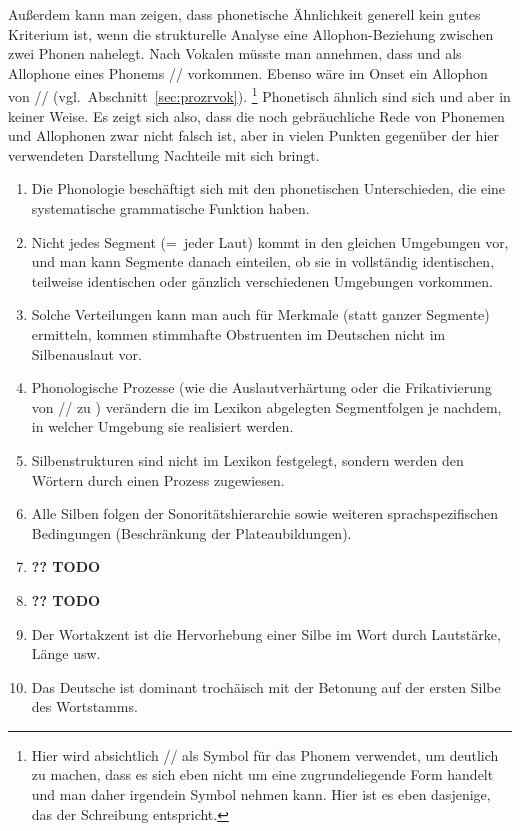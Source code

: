 Außerdem kann man zeigen, dass phonetische Ähnlichkeit generell kein gutes Kriterium ist, wenn die strukturelle Analyse eine Allophon-Beziehung zwischen zwei Phonen nahelegt.
Nach Vokalen müsste man \zB annehmen, dass \textipa{[@]} und \textipa{[5]} als Allophone eines Phonems // vorkommen.
Ebenso wäre im Onset \textipa{[K]} ein Allophon von // (vgl.\ Abschnitt~\ref{sec:prozrvok}).%
\footnote{Hier wird absichtlich // als Symbol für das Phonem verwendet, um deutlich zu machen, dass es sich eben nicht um eine zugrundeliegende Form handelt und man daher irgendein Symbol nehmen kann.
Hier ist es eben dasjenige, das der Schreibung entspricht.}
Phonetisch ähnlich sind sich \textipa{[@]} und \textipa{[K]} aber in keiner Weise.
Es zeigt sich also, dass die noch gebräuchliche Rede von Phonemen und Allophonen zwar nicht falsch ist, aber in vielen Punkten gegenüber der hier verwendeten Darstellung Nachteile mit sich bringt.

\Zusammenfassung

\begin{enumerate}
  \item Die Phonologie beschäftigt sich mit den phonetischen Unterschieden, die eine systematische grammatische Funktion haben.
  \item Nicht jedes Segment (=~jeder Laut) kommt in den gleichen Umgebungen vor, und man kann Segmente danach einteilen, ob sie in vollständig identischen, teilweise identischen oder gänzlich verschiedenen Umgebungen vorkommen.
  \item Solche Verteilungen kann man auch für Merkmale (statt ganzer Segmente) ermitteln, \zB kommen stimmhafte Obstruenten im Deutschen nicht im Silbenauslaut vor.
  \item Phonologische Prozesse (wie die Auslautverhärtung oder die Frikativierung von // zu \textipa{[i\c{c}]}) verändern die im Lexikon abgelegten Segmentfolgen je nachdem, in welcher Umgebung sie realisiert werden.
  \item Silbenstrukturen sind nicht im Lexikon festgelegt, sondern werden den Wörtern durch einen Prozess zugewiesen.
  \item Alle Silben folgen der Sonoritätshierarchie sowie weiteren sprachspezifischen Bedingungen (\zB Beschränkung der Plateaubildungen).
  \item \textbf{?? TODO}
  \item \textbf{?? TODO}
  \item Der Wortakzent ist die Hervorhebung einer Silbe im Wort durch Lautstärke, Länge usw.
  \item Das Deutsche ist dominant trochäisch mit der Betonung auf der ersten Silbe des Wortstamms.
\end{enumerate}

